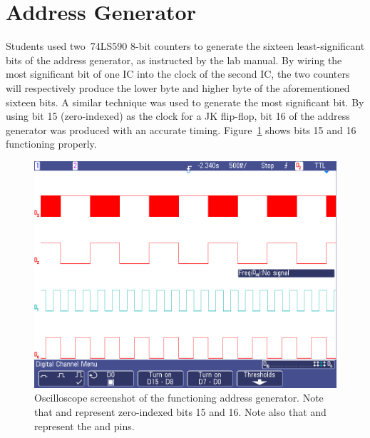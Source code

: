 \section{Address Generator}

Students used two~74LS590 8-bit counters to generate the sixteen
least-significant bits of the address generator, as instructed by the lab
manual.  By wiring the most significant bit of one IC into the clock of the
second IC, the two counters will respectively produce the lower byte and higher
byte of the aforementioned sixteen bits.  A similar technique was used to
generate the most significant bit.  By using bit 15 (zero-indexed) as the clock
for a JK flip-flop, bit 16 of the address generator was produced with an
accurate timing.  Figure~\ref{f:add_gen} shows bits 15 and 16 functioning
properly.
%
\begin{figure}[H]
\centering
	\includegraphics[width=.8\textwidth]{img/shot/add_gen.png}
	\parbox{.8\textwidth}{
	\caption[Functioning Address Generator]{Oscilloscope screenshot of the
	functioning address generator. Note that  and  represent
	zero-indexed bits 15 and 16.  Note also that  and 
	represent the  and  pins.}
	\label{f:add_gen}}
\end{figure}
